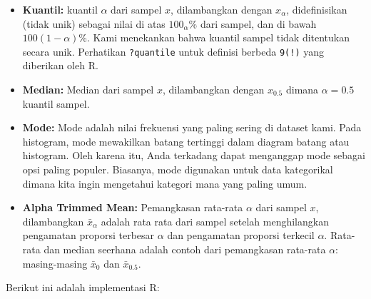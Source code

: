 \documentclass[
]{book}
\newenvironment{Shaded}{\begin{snugshade}}{\end{snugshade}}
\newcommand{\CommentTok}[1]{\textcolor[rgb]{0.56,0.35,0.01}{\textit{#1}}}
\newcommand{\FunctionTok}[1]{\textcolor[rgb]{0.13,0.29,0.53}{\textbf{#1}}}
\newcommand{\NormalTok}[1]{#1}
\newcommand{\OtherTok}[1]{\textcolor[rgb]{0.56,0.35,0.01}{#1}}
\newcommand{\SpecialCharTok}[1]{\textcolor[rgb]{0.81,0.36,0.00}{\textbf{#1}}}
\begin{document}
\begin{itemize}
\item
  \textbf{Kuantil:} kuantil \(\alpha\) dari sampel \(x\), dilambangkan dengan \(x_\alpha\), didefinisikan (tidak unik) sebagai nilai di atas \(100_\alpha\)\% dari sampel, dan di bawah \(100(1-\alpha)\)\%. Kami menekankan bahwa kuantil sampel tidak ditentukan secara unik. Perhatikan \texttt{?quantile} untuk definisi berbeda \texttt{9(!)} yang diberikan oleh R.
\item
  \textbf{Median:} Median dari sampel \(x\), dilambangkan dengan \(x_{0.5}\) dimana \(\alpha=0.5\) kuantil sampel.
\item
  \textbf{Mode:} Mode adalah nilai frekuensi yang paling sering di dataset kami. Pada histogram, mode mewakilkan batang tertinggi dalam diagram batang atau histogram. Oleh karena itu, Anda terkadang dapat menganggap mode sebagai opsi paling populer. Biasanya, mode digunakan untuk data kategorikal dimana kita ingin mengetahui kategori mana yang paling umum.
\item
  \textbf{Alpha Trimmed Mean:} Pemangkasan rata-rata \(\alpha\) dari sampel \(x\), dilambangkan \(\bar{x}_\alpha\) adalah rata rata dari sampel setelah menghilangkan pengamatan proporsi terbesar \(\alpha\) dan pengamatan proporsi terkecil \(\alpha\). Rata-rata dan median seerhana adalah contoh dari pemangkasan rata-rata \(\alpha\): masing-masing \(\bar{x}_0\) dan \(\bar{x}_{0.5}\).
\end{itemize}

Berikut ini adalah implementasi R:

\begin{Shaded}
\end{Shaded}
\end{document}
